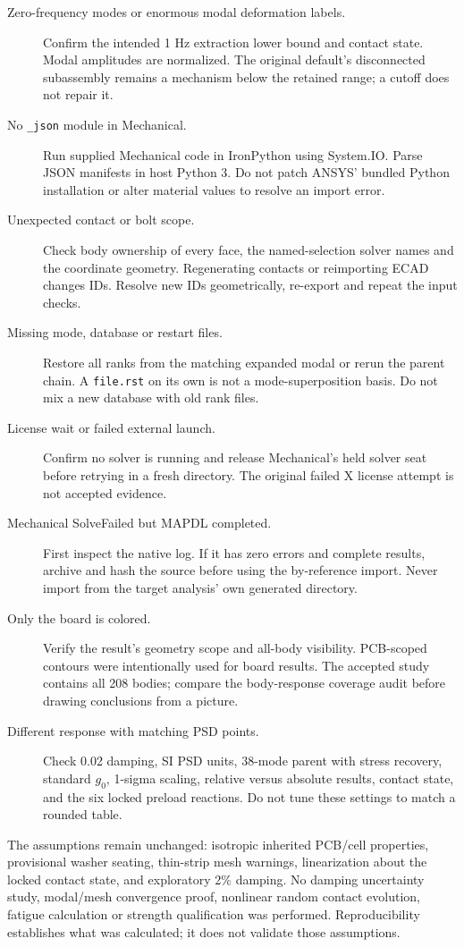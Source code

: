 \documentclass[10pt,a4paper]{article}
\begin{document}
\begin{description}
\item[Zero-frequency modes or enormous modal deformation labels.] Confirm the intended 1 Hz extraction lower bound and contact state. Modal amplitudes are normalized. The original default's disconnected subassembly remains a mechanism below the retained range; a cutoff does not repair it.
\item[No \texttt{\_json} module in Mechanical.] Run supplied Mechanical code in IronPython using System.IO. Parse JSON manifests in host Python 3. Do not patch ANSYS' bundled Python installation or alter material values to resolve an import error.
\item[Unexpected contact or bolt scope.] Check body ownership of every face, the named-selection solver names and the coordinate geometry. Regenerating contacts or reimporting ECAD changes IDs. Resolve new IDs geometrically, re-export and repeat the input checks.
\item[Missing mode, database or restart files.] Restore all ranks from the matching expanded modal or rerun the parent chain. A \texttt{file.rst} on its own is not a mode-superposition basis. Do not mix a new database with old rank files.
\item[License wait or failed external launch.] Confirm no solver is running and release Mechanical's held solver seat before retrying in a fresh directory. The original failed X license attempt is not accepted evidence.
\item[Mechanical SolveFailed but MAPDL completed.] First inspect the native log. If it has zero errors and complete results, archive and hash the source before using the by-reference import. Never import from the target analysis' own generated directory.
\item[Only the board is colored.] Verify the result's geometry scope and all-body visibility. PCB-scoped contours were intentionally used for board results. The accepted study contains all 208 bodies; compare the body-response coverage audit before drawing conclusions from a picture.
\item[Different response with matching PSD points.] Check 0.02 damping, SI PSD units, 38-mode parent with stress recovery, standard $g_0$, 1-sigma scaling, relative versus absolute results, contact state, and the six locked preload reactions. Do not tune these settings to match a rounded table.
\end{description}
The assumptions remain unchanged: isotropic inherited PCB/cell properties, provisional washer seating, thin-strip mesh warnings, linearization about the locked contact state, and exploratory 2\% damping. No damping uncertainty study, modal/mesh convergence proof, nonlinear random contact evolution, fatigue calculation or strength qualification was performed. Reproducibility establishes what was calculated; it does not validate those assumptions.
\end{document}

